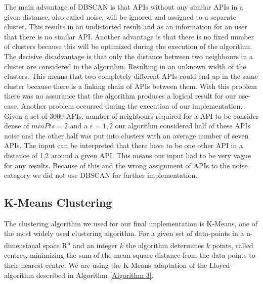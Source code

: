 \documentclass[a4paper]{IEEEtran}
\begin{document}
The main advantage of DBSCAN is that APIs without any similar APIs in a given distance, also called noise, will be ignored and assigned to a separate cluster. This results in an undistorted result and as an information for an user that there is no similar API. 
Another advantage is that there is no fixed number of clusters because this will be optimized during the execution of the algorithm.
The decisive disadvantage is that only the distance between two neighbours in a cluster are considered in the algorithm. Resulting in an unknown width of the clusters. This means that two completely different APIs could end up in the same cluster because there is a linking chain of APIs between them. With this problem there was no assurance that the algorithm produces a logical result for our use-case.
Another problem occurred during the execution of our implementation. Given a set of 3000 APIs, number of neighbours required for a API to be consider dense of $minPts = 2$ and a $ε = 1,2$ our algorithm considered half of these APIs noise and the other half was put into clusters with an average number of seven APIs. The input can be interpreted that there have to be one other API in a distance of 1,2 around a given API. This means our input had to be very vague for any results. Because of this and the wrong assignment of APIs to the noise category we did not use DBSCAN for further implementation.

\subsection{K-Means Clustering}
The clustering algorithm we used for our final implementation is K-Means, one of the most widely used clustering algorithm. For a given set of data-points in a n-dimensional space R\textsuperscript{n} and an integer $k$ the algorithm determines $k$ points, called centres, minimizing the sum of the mean square distance from the data points to their nearest centre. We are using the K-Means adaptation of the Lloyed-algorithm described in Algorithm \ref{Algorithm 3}\cite{kanungo2002efficient}.
\end{document}
